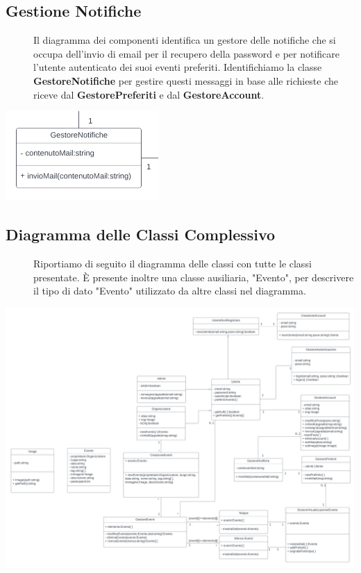\documentclass{article}
\begin{document}
\subsection{Gestione Notifiche}
\begin{description}
    \item[] Il diagramma dei componenti identifica un gestore delle notifiche che si occupa dell'invio di email per il recupero della password e per notificare l'utente autenticato dei suoi eventi preferiti. Identifichiamo la classe \textbf{GestoreNotifiche} per gestire questi messaggi in base alle richieste che riceve dal \textbf{GestorePreferiti} e dal \textbf{GestoreAccount}.
\end{description}
\begin{center}
    \item[] \includegraphics[scale=0.7]{notifiche.png}
\end{center}
\newpage
\subsection{Diagramma delle Classi Complessivo}
\begin{description}
    \item[] Riportiamo di seguito il diagramma delle classi con tutte le classi presentate. È presente inoltre una classe ausiliaria, "Evento", per descrivere il tipo di dato "Evento" utilizzato da altre classi nel diagramma.
\end{description}
\begin{center}
    \item[] \includegraphics[scale=0.40]{class.png}
\end{center}
\clearpage
\end{document}

